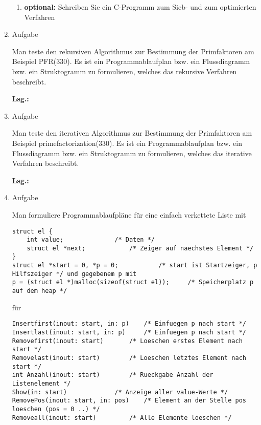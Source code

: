 \documentclass[12pt,a4paper,ngerman]{scrreprt}
\newcommand{\Lsg}{\par \textbf{Lsg.: } \hfill}
\begin{document}
\begin{enumerate}
\begin{enumerate}

\item \textbf{optional:} Schreiben Sie ein C-Programm zum Sieb- und zum optimierten Verfahren
\end{enumerate}

\item Aufgabe %

Man teste den rekursiven Algorithmus zur Bestimmung der Primfaktoren am
Beispiel PFR(330). Es ist ein Programmablaufplan bzw. ein Flussdiagramm bzw. ein Struktogramm zu formulieren, welches das rekursive Verfahren beschreibt.

\Lsg

\item Aufgabe %

Man teste den iterativen Algorithmus zur Bestimmung der Primfaktoren am
Beispiel primefactorization(330). Es ist ein Programmablaufplan bzw. ein Flussdiagramm bzw. ein Struktogramm zu formulieren, welches das iterative Verfahren beschreibt.

\Lsg

\item Aufgabe %

Man formuliere Programmablaufpläne für eine einfach verkettete Liste mit

\begin{lstlisting}
struct el {
	int value;				/* Daten */
	struct el *next;			/* Zeiger auf naechstes Element */
}
struct el *start = 0, *p = 0;			/* start ist Startzeiger, p Hilfszeiger */ und gegebenem p mit
p = (struct el *)malloc(sizeof(struct el)); 	/* Speicherplatz p auf dem heap */
\end{lstlisting}

für

\begin{lstlisting}
Insertfirst(inout: start, in: p)	/* Einfuegen p nach start */
Insertlast(inout: start, in: p)		/* Einfuegen p nach start */
Removefirst(inout: start)		/* Loeschen erstes Element nach start */
Removelast(inout: start)		/* Loeschen letztes Element nach start */
int Anzahl(inout: start)		/* Rueckgabe Anzahl der Listenelement */
Show(in: start)				/* Anzeige aller value-Werte */
RemovePos(inout: start, in: pos)	/* Element an der Stelle pos loeschen (pos = 0 ..) */
Removeall(inout: start)			/* Alle Elemente loeschen */
\end{lstlisting}


\end{enumerate}
\end{document}
